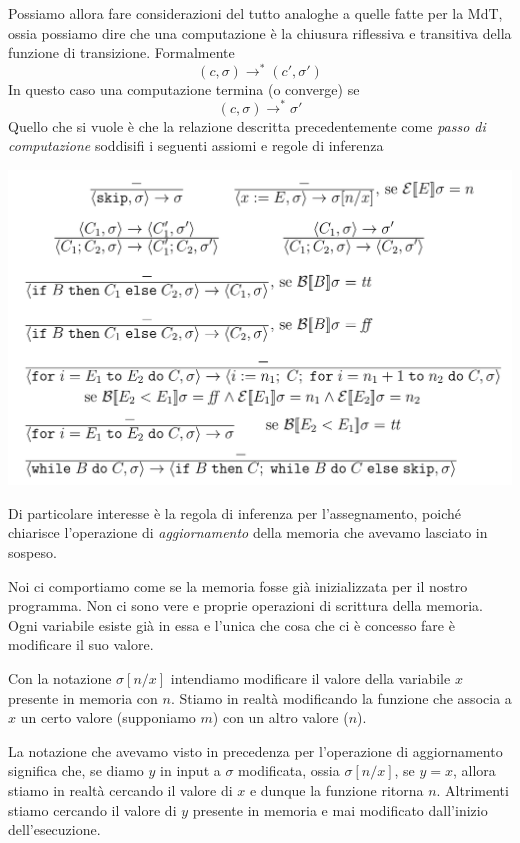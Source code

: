 Possiamo allora fare considerazioni del tutto analoghe a quelle
fatte per la MdT, ossia possiamo dire che una computazione è
la chiusura riflessiva e transitiva della funzione di
transizione. Formalmente
\[ (c, \sigma) \to^* (c', \sigma') \]
In questo caso una computazione termina (o converge) se
\[ (c, \sigma) \to^* \sigma' \]
Quello che si vuole è che la relazione descritta precedentemente
come \emph{passo di computazione} soddisifi i seguenti assiomi
e regole di inferenza
\begin{center}
	\includegraphics[scale=0.225]{images/assiomi.png}
\end{center}
Di particolare interesse è la regola di inferenza per
l'assegnamento, poiché chiarisce l'operazione di
\emph{aggiornamento} della memoria che avevamo lasciato in
sospeso.

Noi ci comportiamo come se la memoria fosse già inizializzata
per il nostro programma. Non ci sono vere e proprie operazioni
di scrittura della memoria. Ogni variabile esiste già in
essa e l'unica che cosa che ci è concesso fare è modificare il
suo valore.

Con la notazione $\sigma[n/x]$ intendiamo modificare il valore
della variabile $x$ presente in memoria con $n$. Stiamo in
realtà modificando la funzione che associa a $x$ un certo
valore (supponiamo $m$) con un altro valore ($n$).

La notazione che avevamo visto in precedenza per l'operazione
di aggiornamento significa che, se diamo $y$ in input a
$\sigma$ modificata, ossia $\sigma [n / x]$, se $y = x$,
allora stiamo in realtà cercando il valore di $x$ e dunque la
funzione ritorna $n$. Altrimenti stiamo cercando il valore di
$y$ presente in memoria e mai modificato dall'inizio
dell'esecuzione.

